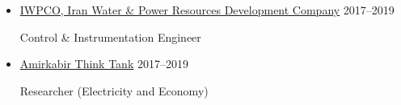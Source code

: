 \documentclass[11pt,a4paper,sans]{moderncv} %
\begin{document}
\begin{itemize}
        \vspace{1em}
		\item \href{https://www.linkedin.com/company/iwpco-iran-water-&-power-resources-development-company/}{
        IWPCO, Iran Water \& Power Resources Development Company} \hfill 2017--2019

        Control \& Instrumentation Engineer 
        
        \vspace{1em}
		\item \href{https://iranthinktanks.com/study-of-currency-code-and-pathology-and-provide-a-solution-for-efficient-policy-of-currency-code-extraction-in-iran/}{
        Amirkabir Think Tank} \hfill 2017--2019

        Researcher (Electricity and Economy)




        
		\end{itemize}
	
\end{document}
